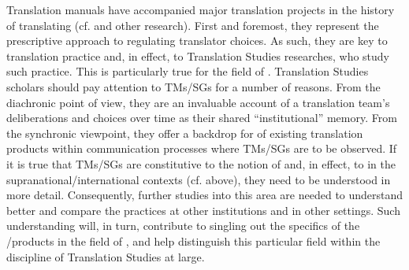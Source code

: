 \documentclass[output=paper]{langsci/langscibook}
\begin{document}
Translation manuals have accompanied major translation projects in the history of translating (cf. \citealt[142]{Kang2009} and other research). First and foremost, they represent the prescriptive approach to regulating translator choices. As such, they are key to translation practice and, in effect, to Translation Studies researches, who study such practice. This is particularly true for the field of . Translation Studies scholars should pay attention to TMs/SGs for a number of reasons. From the diachronic point of view, they are an invaluable account of a translation team’s deliberations and choices over time as their shared “institutional” memory. From the synchronic viewpoint, they offer a backdrop for  of existing translation products within communication processes where TMs/SGs are to be observed. If it is true that TMs/SGs are constitutive to the notion of  and, in effect, to  in the supranational/international contexts (cf.  above), they need to be understood in more detail. Consequently, further studies into this area are needed to understand better and compare the practices at other institutions and in other settings. Such understanding will, in turn, contribute to singling out the specifics of the /products in the field of , and help distinguish this particular field within the discipline of Translation Studies at large.

 

\sloppy
\printbibliography[heading=subbibliography,notkeyword=this] 
\end{document}
